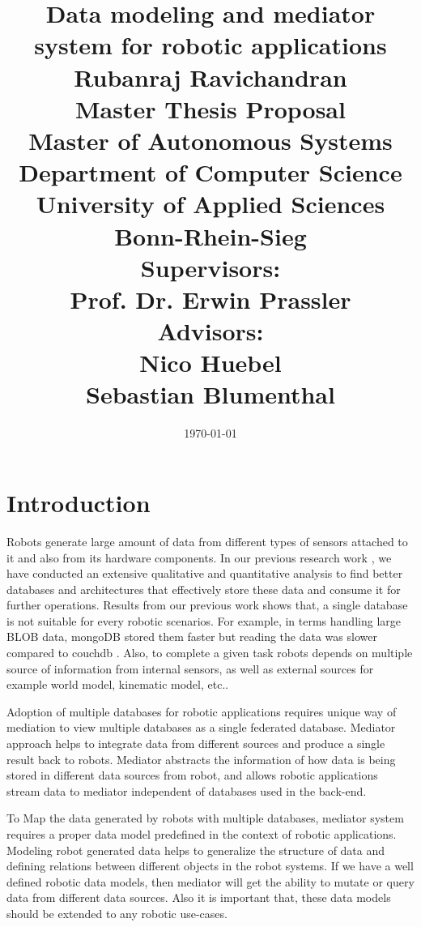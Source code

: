 \documentclass[12pt]{article}
\begin{document}
\title{\Large Data modeling and mediator system for robotic applications\\
[6mm]
\Large Rubanraj Ravichandran\\
[12mm]
\Large Master Thesis Proposal\\
\small Master of Autonomous Systems\\
[12mm]
\Large Department of Computer Science\\
University of Applied Sciences Bonn-Rhein-Sieg\\
[12mm]
\Large Supervisors:\\
Prof. Dr. Erwin Prassler\\
\Large Advisors:\\
Nico Huebel\\
Sebastian Blumenthal
}
\date{\today}
\maketitle
\newpage
\section{Introduction}

Robots generate large amount of data from different types of sensors attached to it and also from its hardware components. In our previous research work \cite{ravichandranworkbench}, we have conducted an extensive qualitative and quantitative analysis to find better databases and architectures that effectively store these data and consume it for further operations. Results from our previous work shows that, a single database is not suitable for every robotic scenarios. For example, in terms handling large BLOB data, mongoDB stored them faster but reading the data was slower compared to couchdb \cite{ravichandranworkbench}. Also, to complete a given task robots depends on multiple source of information from internal sensors, as well as external sources for example world model, kinematic model, etc.. 

Adoption of multiple databases for robotic applications requires unique way of mediation to view multiple databases as a single federated database. Mediator approach helps to integrate data from different sources and produce a single result back to robots. Mediator abstracts the information of how data is being stored in different data sources from robot, and allows robotic applications stream data to mediator independent of databases used in the back-end.

To Map the data generated by robots with multiple databases, mediator system requires a proper data model predefined in the context of robotic applications. Modeling robot generated data helps to generalize the structure of data and defining relations between different objects in the robot systems. If we have a well defined robotic data models, then mediator will get the ability to mutate or query data from different data sources. Also it is important that, these data models should be extended to any robotic use-cases.
\end{document}
